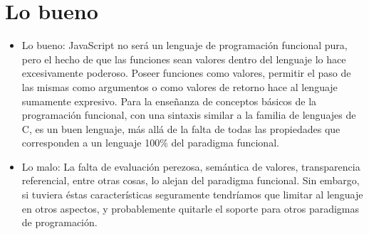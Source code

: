 \section{Lo bueno}

\begin{itemize}
\item Lo bueno: 
JavaScript no será un lenguaje de programación funcional pura, pero el hecho de que las funciones sean valores dentro del lenguaje lo hace excesivamente poderoso. Poseer funciones como valores, permitir el paso de las mismas como argumentos o como valores de retorno hace al lenguaje sumamente expresivo.
Para la enseñanza de conceptos básicos de la programación funcional, con una sintaxis similar a la familia de lenguajes de C, es un buen lenguaje, más allá de la falta de todas las propiedades que corresponden a un lenguaje 100\% del paradigma funcional.
\item Lo malo: 
La falta de evaluación perezosa, semántica de valores, transparencia referencial, entre otras cosas, lo alejan del paradigma funcional. Sin embargo, si tuviera éstas características seguramente tendríamos que limitar al lenguaje en otros aspectos, y probablemente quitarle el soporte para otros paradigmas de programación. 
\end{itemize}


